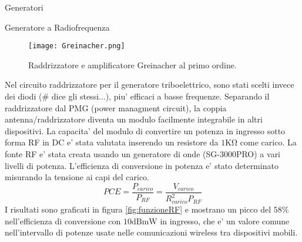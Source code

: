 \begin{section}{Generatori}
\begin{subsection}{Generatore a Radiofrequenza}
        \begin{figure}[H]
            \texttt{[image: Greinacher.png]}
            \centering
            \caption{Raddrizzatore e amplificatore Greinacher al primo ordine.}
            \label{fig:Greinacher}
        \end{figure}
        
        Nel circuito raddrizzatore per il generatore triboelettrico, sono stati scelti invece dei diodi (\# dice gli stessi...), piu' efficaci a basse frequenze. Separando il raddrizzatore dal PMG (power managment circuit), la coppia antenna/raddrizzatore diventa un modulo facilmente integrabile in altri dispositivi. La capacita' del modulo di convertire un potenza in ingresso sotto forma RF in DC e' stata valutata inserendo un resistore da \(1\mathrm{K\Omega}\) come carico. La fonte RF e' stata creata usando un generatore di onde (SG-3000PRO) a vari livelli di potenza. L'efficienza di conversione in potenza e' stato determinato misurando la tensione ai capi del carico. 
        \begin{equation*}
            PCE = \frac{P_{carico}}{P_{RF}} = \frac{V_{carico}}{R_{carico}^2P_{RF}}
        \end{equation*}
        I risultati sono graficati in figura \ref{fig:funzioneRF} e mostrano un picco del \(58\%\) nell'efficienza di conversione con \(10\mathrm{dBmW}\) in ingresso, che e' un valore comune nell'intervallo di potenze usate nelle comunicazioni wireless tra dispositivi mobili. 
    \end{subsection}
\end{section}

